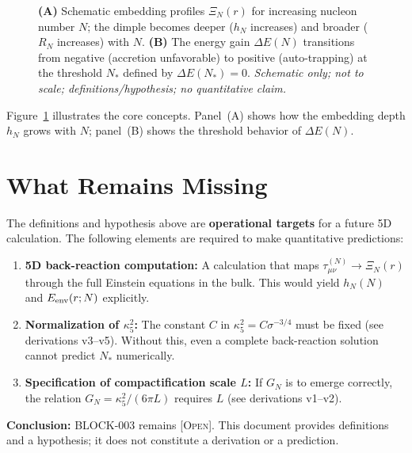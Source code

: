 \documentclass[11pt,a4paper]{article}
\newcommand{\Open}{\textsc{[Open]}}
\begin{document}
\begin{figure}[ht]
\caption{\textbf{(A)} Schematic embedding profiles $\Xi_N(r)$ for increasing
nucleon number $N$; the dimple becomes deeper ($h_N$ increases) and broader
($R_N$ increases) with $N$. \textbf{(B)} The energy gain $\Delta E(N)$
transitions from negative (accretion unfavorable) to positive (auto-trapping)
at the threshold $N_*$ defined by $\Delta E(N_*) = 0$.
\textit{Schematic only; not to scale; definitions/hypothesis; no quantitative claim.}}
\label{fig:autotrap_schematic}
\end{figure}

Figure~\ref{fig:autotrap_schematic} illustrates the core concepts. Panel~(A)
shows how the embedding depth $h_N$ grows with $N$; panel~(B) shows the
threshold behavior of $\Delta E(N)$.

\section{What Remains Missing}

\begin{statusbox}
The definitions and hypothesis above are \textbf{operational targets} for
a future 5D calculation. The following elements are required to make
quantitative predictions:

\begin{enumerate}
\item \textbf{5D back-reaction computation:} A calculation that maps
$\tau_{\mu\nu}^{(N)} \to \Xi_N(r)$ through the full Einstein equations
in the bulk. This would yield $h_N(N)$ and $E_{\rm env}(r; N)$ explicitly.

\item \textbf{Normalization of $\kappa_5^2$:} The constant $C$ in
$\kappa_5^2 = C \sigma^{-3/4}$ must be fixed (see derivations v3--v5).
Without this, even a complete back-reaction solution cannot predict
$N_*$ numerically.

\item \textbf{Specification of compactification scale $L$:} If $G_N$
is to emerge correctly, the relation $G_N = \kappa_5^2 / (6\pi L)$
requires $L$ (see derivations v1--v2).
\end{enumerate}

\textbf{Conclusion:} BLOCK-003 remains \Open. This document provides
definitions and a hypothesis; it does not constitute a derivation or
a prediction.
\end{statusbox}
\end{document}
